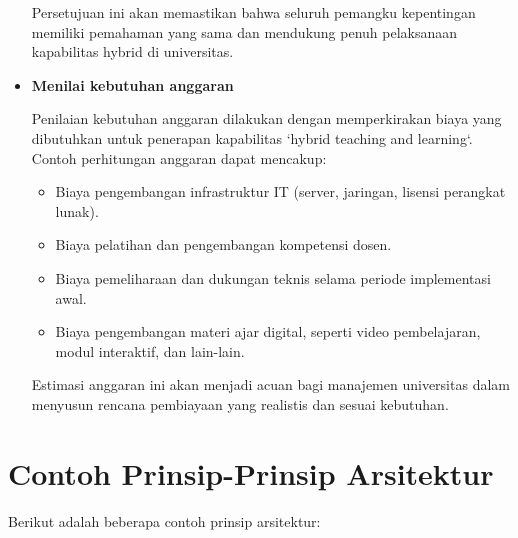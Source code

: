 \begin{itemize}
	Persetujuan ini akan memastikan bahwa seluruh pemangku kepentingan memiliki pemahaman yang sama dan mendukung penuh pelaksanaan kapabilitas hybrid di universitas.
	
	\item \textbf{Menilai kebutuhan anggaran}
	
	Penilaian kebutuhan anggaran dilakukan dengan memperkirakan biaya yang dibutuhkan untuk penerapan kapabilitas `hybrid teaching and learning`. Contoh perhitungan anggaran dapat mencakup:
	\begin{itemize}
		\item Biaya pengembangan infrastruktur IT (server, jaringan, lisensi perangkat lunak).
		\item Biaya pelatihan dan pengembangan kompetensi dosen.
		\item Biaya pemeliharaan dan dukungan teknis selama periode implementasi awal.
		\item Biaya pengembangan materi ajar digital, seperti video pembelajaran, modul interaktif, dan lain-lain.
	\end{itemize}
	
	Estimasi anggaran ini akan menjadi acuan bagi manajemen universitas dalam menyusun rencana pembiayaan yang realistis dan sesuai kebutuhan.
\end{itemize}

\section{Contoh Prinsip-Prinsip Arsitektur}
Berikut adalah beberapa contoh prinsip arsitektur:


